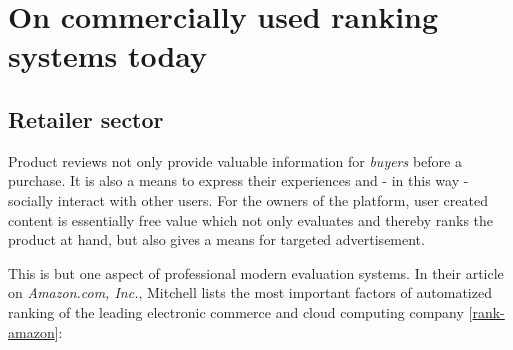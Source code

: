 
\section{On commercially used ranking systems today}

\subsection{Retailer sector} %
Product reviews not only provide valuable information for {\emph{buyers}} before a purchase.
It is also a means to express their experiences and - in this way - socially interact with other users. 
For the owners of the platform, user created content is essentially free value which not only 
evaluates and thereby ranks the product at hand, but also gives a means for targeted advertisement. 

This is but one aspect of professional modern evaluation systems.
In their article on {\emph{Amazon.com, Inc.}}, Mitchell lists the most important factors of automatized ranking of 
the leading electronic commerce and cloud computing company [\href{https://startupbros.com/rank-amazon/}{rank-amazon}]: %

{\color{green}{
	TODO: redo this list, make many of those items to topics in themselves. If you keep the list as such, write it down more concisely.
}} %

